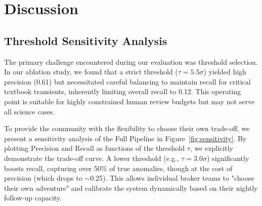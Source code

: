 \documentclass[10pt,journal,compsoc]{IEEEtran}
\begin{document}
\section{Discussion}
\subsection{Threshold Sensitivity Analysis}
The primary challenge encountered during our evaluation was threshold selection. In our ablation study, we found that a strict threshold ($\tau = 5.5\sigma$) yielded high precision (0.61) but necessitated careful balancing to maintain recall for critical textbook transients, inherently limiting overall recall to 0.12. This operating point is suitable for highly constrained human review budgets but may not serve all science cases. 

To provide the community with the flexibility to choose their own trade-off, we present a sensitivity analysis of the Full Pipeline in Figure~\ref{fig:sensitivity}. By plotting Precision and Recall as functions of the threshold $\tau$, we explicitly demonstrate the trade-off curve. A lower threshold (e.g., $\tau = 3.0\sigma$) significantly boosts recall, capturing over 50\% of true anomalies, though at the cost of precision (which drops to $\sim$0.25). This allows individual broker teams to "choose their own adventure" and calibrate the system dynamically based on their nightly follow-up capacity.
\end{document}
